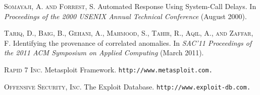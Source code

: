 \documentclass[10pt,twocolumn]{article}
\begin{document}
\begin{thebibliography}{99}
\textsc{Somayaji, A. and Forrest, S.} Automated Response Using System-Call Delays. In {\em Proceedings of the 2000 USENIX Annual Technical Conference} (August 2000).

\textsc{Tariq, D., Baig, B., Gehani, A., Mahmood, S., Tahir, R., Aqil, A., and Zaffar, F.} Identifying the provenance of correlated anomalies. In {\em SAC'11 Proceedings of the 2011 ACM Symposium on Applied Computing} (March 2011).

\textsc{Rapid 7 Inc.} Metasploit Framework. \tt{http://www.metasploit.com}.

\textsc{Offensive Security, Inc.} The Exploit Database. \tt{http://www.exploit-db.com}.
\end{thebibliography}
\end{document}
